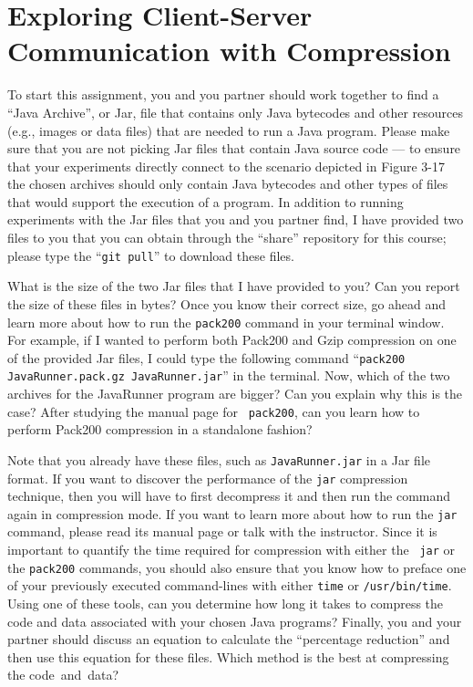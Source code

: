 \section*{Exploring Client-Server Communication with Compression}

To start this assignment, you and you partner should work together to find a ``Java Archive'', or Jar, file that
contains only Java bytecodes and other resources (e.g., images or data files) that are needed to run a Java program.
Please make sure that you are not picking Jar files that contain Java source code --- to ensure that your experiments
directly connect to the scenario depicted in Figure 3-17 the chosen archives should only contain Java bytecodes and
other types of files that would support the execution of a program. In addition to running experiments with the Jar
files that you and you partner find, I have provided two files to you that you can obtain through the ``share''
repository for this course; please type the ``{\tt git pull}'' to download these files.

What is the size of the two Jar files that I have provided to you? Can you report the size of these files in bytes? Once
you know their correct size, go ahead and learn more about how to run the {\tt pack200} command in your terminal window.
For example, if I wanted to perform both Pack200 and Gzip compression on one of the provided Jar files, I could type the
following command ``{\tt pack200 JavaRunner.pack.gz JavaRunner.jar}'' in the terminal. Now, which of the two archives
for the JavaRunner program are bigger? Can you explain why this is the case? After studying the manual page for {\tt
pack200}, can you learn how to perform Pack200 compression in a standalone fashion?

Note that you already have these files, such as {\tt JavaRunner.jar} in a Jar file format. If you want to discover the
performance of the {\tt jar} compression technique, then you will have to first decompress it and then run the command
again in compression mode. If you want to learn more about how to run the {\tt jar} command, please read its manual page
or talk with the instructor.  Since it is important to quantify the time required for compression with either the {\tt
jar} or the {\tt pack200} commands, you should also ensure that you know how to preface one of your previously executed
command-lines with either {\tt time} or {\tt /usr/bin/time}. Using one of these tools, can you determine how long it
takes to compress the code and data associated with your chosen Java programs? Finally, you and your partner should
discuss an equation to calculate the ``percentage reduction'' and then use this equation for these files. Which method
is the best at compressing the \mbox{code and data?}

